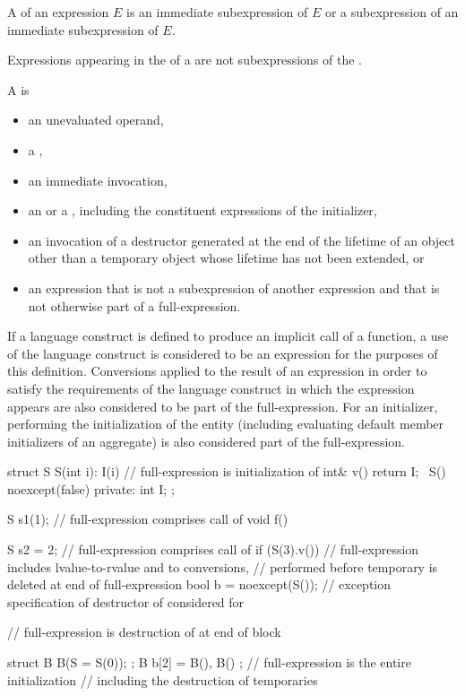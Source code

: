 \pnum
A  of an expression $E$ is
an immediate subexpression of $E$ or
a subexpression of an immediate subexpression of $E$.
\begin{note}
Expressions appearing in the  of a 
are not subexpressions of the .
\end{note}

\pnum
A  is
\begin{itemize}
\item
an unevaluated operand,
\item
a ,
\item
an immediate invocation,
\item
an  or
a ,
including the constituent expressions of the initializer,
\item
an invocation of a destructor generated at the end of the lifetime
of an object other than a temporary object
whose lifetime has not been extended, or
\item
an expression that is not a subexpression of another expression and
that is not otherwise part of a full-expression.
\end{itemize}
If a language construct is defined to produce an implicit call of a function,
a use of the language construct is considered to be an expression
for the purposes of this definition.
Conversions applied to the result of an expression in order to satisfy the requirements
of the language construct in which the expression appears
are also considered to be part of the full-expression.
For an initializer, performing the initialization of the entity
(including evaluating default member initializers of an aggregate)
is also considered part of the full-expression.
\begin{example}
\begin{codeblock}
struct S {
  S(int i): I(i) { }            // full-expression is initialization of 
  int& v() { return I; }
  ~S() noexcept(false) { }
private:
  int I;
};

S s1(1);                        // full-expression comprises call of 
void f() {
  S s2 = 2;                     // full-expression comprises call of 
  if (S(3).v())                 // full-expression includes lvalue-to-rvalue and  to  conversions,
                                // performed before temporary is deleted at end of full-expression
  { }
  bool b = noexcept(S());       // exception specification of destructor of  considered for 

  // full-expression is destruction of  at end of block
}
struct B {
  B(S = S(0));
};
B b[2] = { B(), B() };          // full-expression is the entire initialization
                                // including the destruction of temporaries
\end{codeblock}
\end{example}

